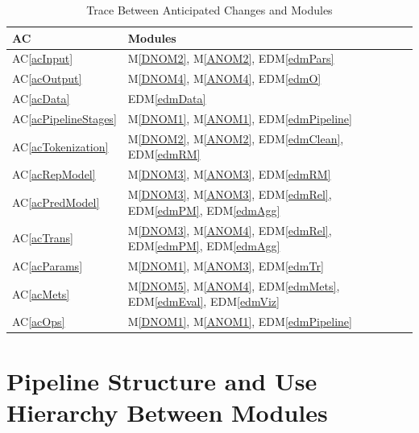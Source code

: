 \documentclass[12pt, titlepage]{article}
\newcommand{\acref}[1]{AC\ref{#1}}
\newcommand{\mref}[1]{M\ref{#1}}
\newcommand{\edmref}[1]{EDM\ref{#1}}
\begin{document}
\begin{table}[H]
\centering
\begin{tabular}{p{} p{}}
\toprule
\textbf{AC} & \textbf{Modules}\\
\midrule
\acref{acInput} & \mref{DNOM2}, \mref{ANOM2}, \edmref{edmPars}\\
\acref{acOutput} & \mref{DNOM4}, \mref{ANOM4}, \edmref{edmO}\\
\acref{acData} & \edmref{edmData}\\
\acref{acPipelineStages} & \mref{DNOM1}, \mref{ANOM1}, \edmref{edmPipeline}\\
\acref{acTokenization} & \mref{DNOM2}, \mref{ANOM2}, \edmref{edmClean}, \edmref{edmRM}\\
\acref{acRepModel} & \mref{DNOM3}, \mref{ANOM3}, \edmref{edmRM}\\
\acref{acPredModel} & \mref{DNOM3}, \mref{ANOM3}, \edmref{edmRel}, \edmref{edmPM}, \edmref{edmAgg}\\
\acref{acTrans} & \mref{DNOM3}, \mref{ANOM4}, \edmref{edmRel}, \edmref{edmPM}, \edmref{edmAgg}\\
\acref{acParams} & \mref{DNOM1}, \mref{ANOM3}, \edmref{edmTr}\\
\acref{acMets} & \mref{DNOM5}, \mref{ANOM4}, \edmref{edmMets}, \edmref{edmEval}, \edmref{edmViz}\\
\acref{acOps} & \mref{DNOM1}, \mref{ANOM1}, \edmref{edmPipeline}\\

\bottomrule
\end{tabular}
\caption{Trace Between Anticipated Changes and Modules}
\label{TblACT}
\end{table}

\section{Pipeline Structure and Use Hierarchy Between Modules} \label{SecUse}

\end{document}
